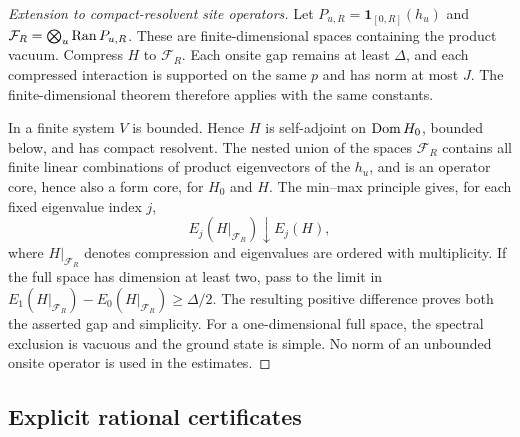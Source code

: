 \begin{proof}[Extension to compact-resolvent site operators]
Let $P_{u,R}=\boldsymbol{1}_{[0,R]}(h_u)$ and
$\mathcal F_R=\bigotimes_u\operatorname{Ran} P_{u,R}$. These are finite-dimensional
spaces containing the product vacuum. Compress $H$ to $\mathcal F_R$.
Each onsite gap remains at least $\Delta$, and each compressed
interaction is supported on the same $p$ and has norm at most $J$.
The finite-dimensional theorem therefore applies with the same constants.

In a finite system $V$ is bounded. Hence $H$ is self-adjoint on
$\operatorname{Dom} H_0$, bounded below, and has compact resolvent. The nested
union of the spaces $\mathcal F_R$ contains all finite linear
combinations of product eigenvectors of the $h_u$, and is an operator
core, hence also a form core, for $H_0$ and $H$.
The min--max principle gives, for each fixed eigenvalue index $j$,
\[
 E_j(H|_{\mathcal F_R})\mathbin{\downarrow}E_j(H),
\]
where $H|_{\mathcal F_R}$ denotes compression and eigenvalues are
ordered with multiplicity. If the full space has dimension at least
two, pass to the limit in
$E_1(H|_{\mathcal F_R})-E_0(H|_{\mathcal F_R})\ge\Delta/2$.
The resulting positive difference proves both the asserted gap and
simplicity. For a one-dimensional full space, the spectral exclusion
is vacuous and the ground state is simple. No norm of an unbounded
onsite operator is used in the estimates.
\end{proof}

\subsection{Explicit rational certificates}
\label{sc:certificates}

